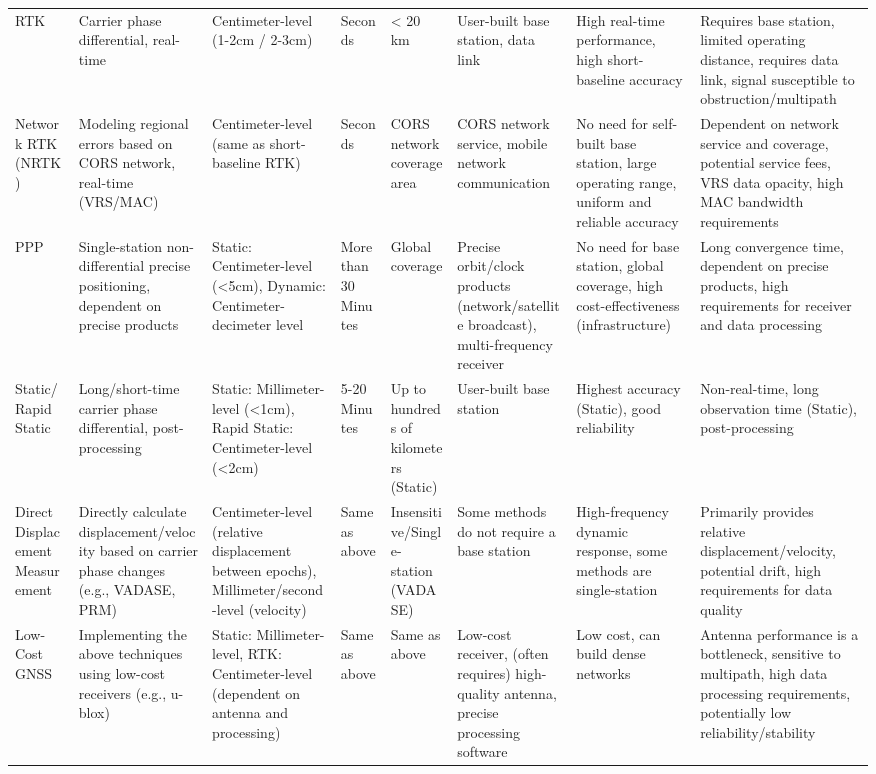 \documentclass[preprint,11pt,authoryear,3p]{elsarticle}
\begin{document}
\begin{landscape}
\begin{longtable}{p{5em}p{8em}p{7em}p{5em}p{7em}p{7em}p{6em}p{12em}}
        RTK & Carrier phase differential, real-time & Centimeter-level (1-2cm / 2-3cm) & Seconds & < 20 km & User-built base station, data link & High real-time performance, high short-baseline accuracy & Requires base station, limited operating distance, requires data link, signal susceptible to obstruction/multipath \\
        Network RTK (NRTK) & Modeling regional errors based on CORS network, real-time (VRS/MAC) & Centimeter-level (same as short-baseline RTK) & Seconds & CORS network coverage area & CORS network service, mobile network communication & No need for self-built base station, large operating range, uniform and reliable accuracy & Dependent on network service and coverage, potential service fees, VRS data opacity, high MAC bandwidth requirements \\
        PPP & Single-station non-differential precise positioning, dependent on precise products & Static: Centimeter-level (<5cm), Dynamic: Centimeter-decimeter level & More than 30 Minutes & Global coverage & Precise orbit/clock products (network/satellite broadcast), multi-frequency receiver & No need for base station, global coverage, high cost-effectiveness (infrastructure) & Long convergence time, dependent on precise products, high requirements for receiver and data processing \\
        Static/Rapid Static & Long/short-time carrier phase differential, post-processing & Static: Millimeter-level (<1cm), Rapid Static: Centimeter-level (<2cm) & 5-20 Minutes & Up to hundreds of kilometers (Static) & User-built base station & Highest accuracy (Static), good reliability & Non-real-time, long observation time (Static), post-processing \\
        Direct Displacement Measurement & Directly calculate displacement/velocity based on carrier phase changes (e.g., VADASE, PRM) & Centimeter-level (relative displacement between epochs), Millimeter/second-level (velocity) & Same as above & Insensitive/Single-station (VADASE) & Some methods do not require a base station & High-frequency dynamic response, some methods are single-station & Primarily provides relative displacement/velocity, potential drift, high requirements for data quality \\
        Low-Cost GNSS & Implementing the above techniques using low-cost receivers (e.g., u-blox) & Static: Millimeter-level, RTK: Centimeter-level (dependent on antenna and processing) & Same as above & Same as above & Low-cost receiver, (often requires) high-quality antenna, precise processing software & Low cost, can build dense networks & Antenna performance is a bottleneck, sensitive to multipath, high data processing requirements, potentially low reliability/stability \\
    \end{longtable}
\end{landscape} 
\end{document}
